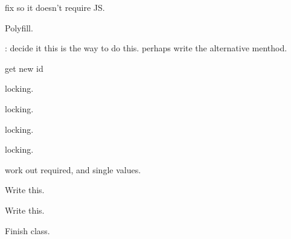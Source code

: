 
\begin{DoxyRefList}
\item[\label{todo__todo000006}%
\hypertarget{todo__todo000006}{}%
Member \hyperlink{classdatalist__input_aba53bff8ed66c85b97ce1ff23bfc15ec}{datalist\-\_\-input\-:\-:form} (\$errors=array())]fix so it doesn't require J\-S.  
\item[\label{todo__todo000005}%
\hypertarget{todo__todo000005}{}%
Class \hyperlink{classdate__input}{date\-\_\-input} ]Polyfill.  
\item[\label{todo__todo000001}%
\hypertarget{todo__todo000001}{}%
Class \hyperlink{classdb__form}{db\-\_\-form} ]\-: decide it this is the way to do this. perhaps write the alternative menthod.  
\item[\label{todo__todo000004}%
\hypertarget{todo__todo000004}{}%
Member \hyperlink{classdb__form_a39893c90e5b3364fdae768079ff66520}{db\-\_\-form\-:\-:create\-\_\-sql} ()]
\item[\label{todo__todo000003}%
\hypertarget{todo__todo000003}{}%
Member \hyperlink{classdb__form_a09bce6f14faa4db14589a8627c782b4c}{db\-\_\-form\-:\-:delete} ()]
\item[\label{todo__todo000002}%
\hypertarget{todo__todo000002}{}%
Member \hyperlink{classdb__form_a132f6a150aad88391ce063711c08ace3}{db\-\_\-form\-:\-:update} ()]
\item[\label{todo__todo000007}%
\hypertarget{todo__todo000007}{}%
Member \hyperlink{classfile__form_a17b09200249a2b5c41261a19693dada8}{file\-\_\-form\-:\-:create} ()]get new id 

locking.  
\item[\label{todo__todo000010}%
\hypertarget{todo__todo000010}{}%
Member \hyperlink{classfile__form_aacbb6b50c48c05a74dd26e8abaee749a}{file\-\_\-form\-:\-:delete} ()]locking.  
\item[\label{todo__todo000008}%
\hypertarget{todo__todo000008}{}%
Member \hyperlink{classfile__form_ab7dce3d792551f836f20948fa9c8ef13}{file\-\_\-form\-:\-:read} ()]locking.  
\item[\label{todo__todo000009}%
\hypertarget{todo__todo000009}{}%
Member \hyperlink{classfile__form_ad9573af92f2b4758204df70c01335f2e}{file\-\_\-form\-:\-:update} ()]locking.  
\item[\label{todo__todo000011}%
\hypertarget{todo__todo000011}{}%
Member \hyperlink{classinput__group_aef532e921771fbfccacbdefba1db7dce}{input\-\_\-group\-:\-:input\-\_\-group} (\$label\-\_\-text, \$name, \$value\-\_\-list, \$type= 'checkbox', \$value= '', \$required= '', \$placeholder= '', \$sanity\-\_\-func=null, \$valid\-\_\-func=null)]work out required, and single values.  
\item[\label{todo__todo000012}%
\hypertarget{todo__todo000012}{}%
Member \hyperlink{classinput__group_a4f0f7f8aeb74550c99114f28dca449cb}{input\-\_\-group\-:\-:sanitize} ()]Write this.  
\item[\label{todo__todo000013}%
\hypertarget{todo__todo000013}{}%
Member \hyperlink{classinput__group_ae0461a6034effccc3ca6bf34b6539cdd}{input\-\_\-group\-:\-:validate} (\$errors=array())]Write this.  
\item[\label{todo__todo000014}%
\hypertarget{todo__todo000014}{}%
Class \hyperlink{classpage}{page} ]Finish class. 


\end{DoxyRefList}
